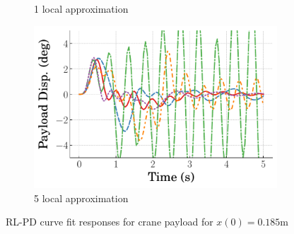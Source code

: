 \begin{figure}
\begin{subfigure}[b]{0.32\textwidth}
        \caption{1 local approximation}
        \label{subfig_chap5:dpcrane_RL_PD_payload_0.185_init_curve_fit_1_bins_unclipped}
    \end{subfigure}
    \hfill
    \begin{subfigure}[b]{0.32\textwidth}
        \centering
        \includegraphics[width=\textwidth]{figures/figures_Interpretability/Mean_ISE_dpcrane_cubic_5_bins/curve_fit_time_responses/RL_PD/curve_fit_0p18_Payload_Disp.pdf} 
        \caption{5 local approximation}
        \label{subfig_chap5:dpcrane_RL_PD_payload_0.185_init_curve_fit_5_bins_unclipped}
    \end{subfigure}
    \hfill
    \caption{RL-PD curve fit responses for crane payload for $x(0)=0.185\si{\meter}$}
    \label{fig_chap5:dpcrane_RL_PD_payload_0.185_init_unclipped}
\end{figure}
%

